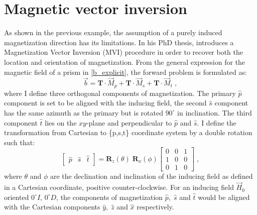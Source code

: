 \newpage
\section{Magnetic vector inversion}
As shown in the previous example, the assumption of a purely induced magnetization direction has its limitations. In his PhD thesis, \cite{PhDLelievre09} introduces a Magnetization Vector Inversion (MVI) procedure in order to recover both the location and orientation of magnetization. From the general expression for the magnetic field of a prism in \ref{b_explicit}, the forward problem is formulated as:
\begin{equation}\label{MVI_1d}
	\vec{b} = \mathbf{T}\cdot \vec M_p +  \mathbf{T}\cdot \vec M_s +  \mathbf{T}\cdot \vec M_t\;,
\end{equation}
where I define three orthogonal components of magnetization. The primary $\hat{p}$ component is set to be aligned with the inducing field,  the second $\hat{s}$ component has the same azimuth as the primary but is rotated $90^{\circ}$ in inclination. The third component $\hat{t}$ lies on the $xy$-plane and perpendicular to  $\hat{p}$ and $\hat{s}$.
I define the transformation from Cartesian to \{p,s,t\} coordinate system by a double rotation such that:
\begin{equation} 
	\begin{bmatrix} \hat{{p}} & \hat{{s}} & \hat{{t}} \end{bmatrix} = \mathbf{R}_z ({\theta}) \; \mathbf{R}_x ({\phi}) 
	\begin{bmatrix}
	 0 & 0 & 1\\
	1 & 0 & 0 \\
	0 & 1 & 0
	\end{bmatrix}\;,
\end{equation}
where $\theta$ and $\phi$ are the declination and inclination of the inducing field as defined in a Cartesian coordinate, positive counter-clockwise. 
For an inducing field $\vec H_0$ oriented $0^{\circ} I$, $0^{\circ} D$, the components of magnetization $\hat p, \; \hat s$ and $ \hat t$ would be aligned with the Cartesian components $\hat y, \; \hat z$ and $ \hat x$ respectively. 

